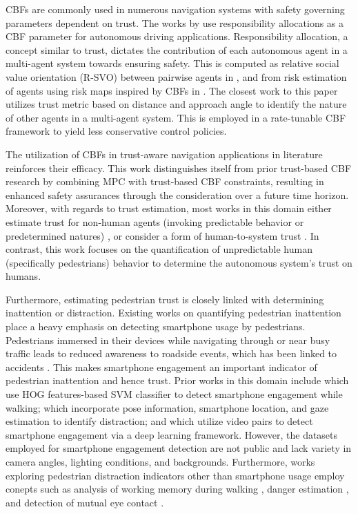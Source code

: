 \documentclass[journal]{IEEEtran}
\begin{document}
CBFs are commonly used in numerous navigation systems with safety governing parameters dependent on trust. The works by \cite{cosner2023learning, lyu2022responsibilityassociated, lyu2023risk} use responsibility allocations as a CBF parameter for autonomous driving applications. Responsibility allocation, a concept similar to trust, dictates the contribution of each autonomous agent in a multi-agent system towards ensuring safety. This is computed as relative social value orientation (R-SVO) between pairwise agents in \cite{lyu2022responsibilityassociated}, and from risk estimation of agents using risk maps inspired by CBFs in \cite{lyu2023risk}. The closest work to this paper \cite{parwana2022trust} utilizes trust metric based on distance and approach angle to identify the nature of other agents in a multi-agent system. This is employed in a rate-tunable CBF framework to yield less conservative control policies.

The utilization of CBFs in trust-aware navigation applications in literature reinforces their efficacy. This work distinguishes itself from prior trust-based CBF research by combining MPC with trust-based CBF constraints, resulting in enhanced safety assurances through the consideration over a future time horizon. Moreover, with regards to trust estimation, most works in this domain either estimate trust for non-human agents (invoking predictable behavior or predetermined natures) \cite{valtazanos2011intent, parwana2022trust, sabbir2023trust, brito2021learning}, or consider a form of human-to-system trust \cite{fooladi2021bayesian, hu2021trust, zahedi2023trust, ozkan2022trustaware}. In contrast, this work focuses on the quantification of unpredictable human (specifically pedestrians) behavior to determine the autonomous system's trust on humans.

Furthermore, estimating pedestrian trust is closely linked with determining inattention or distraction. Existing works on quantifying pedestrian inattention place a heavy emphasis on detecting smartphone usage by pedestrians. Pedestrians immersed in their devices while navigating through or near busy traffic leads to reduced awareness to roadside events, which has been linked to accidents \cite{frej2022smartphone, lin2017impact}. This makes smartphone engagement an important indicator of pedestrian inattention and hence trust. Prior works in this domain include \cite{shinmura2015pedestrian, shinmura2017recognition} which use HOG features-based SVM classifier to detect smartphone engagement while walking; \cite{rangesh2016pedestrians, rangesh2018vehicles} which incorporate pose information, smartphone location, and gaze estimation to identify distraction; and \cite{saenz2021detecting, hatay2021learning} which utilize video pairs to detect smartphone engagement via a deep learning framework. However, the datasets employed for smartphone engagement detection are not public and lack variety in camera angles, lighting conditions, and backgrounds. Furthermore, works exploring pedestrian distraction indicators other than smartphone usage employ conepts such as analysis of working memory during walking \cite{uemura2016estimating}, danger estimation \cite{kusakari2020deep}, and detection of mutual eye contact \cite{belkada2021pedestrians, hata2022detection}.
\end{document}
